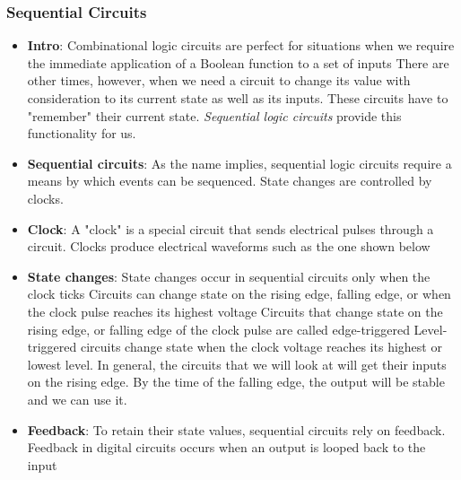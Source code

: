 \documentclass{report}
\begin{document}
    \subsubsection{Sequential Circuits}
    \begin{itemize}
        \item \textbf{Intro}: Combinational logic circuits are perfect for situations when we require the immediate application of a Boolean function to a set of inputs
            \bigbreak \noindent 
            There are other times, however, when we need a circuit to change its value with consideration to its current state as well as its inputs.
            \bigbreak \noindent 
            These circuits have to "remember" their current state.
            \bigbreak \noindent 
            \textit{Sequential logic circuits} provide this functionality for us.
        \item \textbf{Sequential circuits}: As the name implies, sequential logic circuits require a means by which events can be sequenced.
            \bigbreak \noindent 
            State changes are controlled by clocks.
        \item \textbf{Clock}: A "clock" is a special circuit that sends electrical pulses through a circuit.
            \bigbreak \noindent 
            Clocks produce electrical waveforms such as the one shown below
            \bigbreak \noindent 
        \item \textbf{State changes}: State changes occur in sequential circuits only when the clock ticks
            \bigbreak \noindent 
            Circuits can change state on the rising edge, falling edge, or when the clock pulse reaches its highest voltage
            \bigbreak \noindent 
            \bigbreak \noindent 
            Circuits that change state on the rising edge, or falling edge of the clock pulse are called edge-triggered
            \bigbreak \noindent 
            Level-triggered circuits change state when the clock voltage reaches its highest or lowest level.
            \bigbreak \noindent 
            In general, the circuits that we will look at will get their inputs on the rising edge.
            \bigbreak \noindent 
             By the time of the falling edge, the output will be stable and we can use it.
        \item \textbf{Feedback}: To retain their state values, sequential circuits rely on feedback.
            \bigbreak \noindent 
            Feedback in digital circuits occurs when an output is looped back to the input

\end{itemize}
\end{document}

